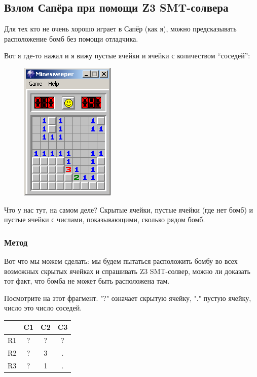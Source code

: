 \subsection{Взлом Сапёра при помощи Z3 SMT-солвера}
\label{minesweeper_SMT}

Для тех кто не очень хорошо играет в Сапёр (как я), можно предсказывать расположение бомб без помощи отладчика.

Вот я где-то нажал и я вижу пустые ячейки и ячейки с количеством ``соседей'':

\begin{figure}[H]
\centering
\includegraphics[scale=0.75]{SMT/minesweeper/1.png}
\end{figure}

Что у нас тут, на самом деле? Скрытые ячейки, пустые ячейки (где нет бомб) и пустые ячейки с числами,
показывающими, сколько рядом бомб.

\subsubsection{Метод}

Вот что мы можем сделать: мы будем пытаться расположить бомбу во всех возможных скрытых ячейках и спрашивать Z3 SMT-солвер,
можно ли доказать тот факт, что бомба не может быть расположена там.

Посмотрите на этот фрагмент. "?" означает скрытую ячейку, "." пустую ячейку, число это число соседей.

\begin{center}
\begin{tabular}{ | c | c | c | c | }
\hline
 & C1 & C2 & C3 \\
\hline
R1 & ? & ? & ? \\
\hline
R2 & ? & 3 & . \\
\hline
R3 & ? & 1 & . \\
\hline
\end{tabular}
\end{center}

